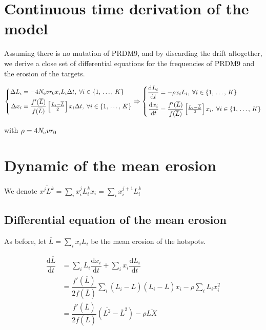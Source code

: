 \documentclass{article}
\begin{document}
\section{Continuous time derivation of the model}
Assuming there is no mutation of PRDM9, and by discarding the drift altogether, we derive a close set of differential equations for the frequencies of PRDM9 and the erosion of the targets.

\begin{equation}
  \left\{
      \begin{aligned}
        \mathrm{\Delta}L_i &= 
        - 4 N_\mathrm{e} v r _0  x_i L_i \mathrm{\Delta}t, \;
             \forall i \in \{ 1, \, \dots, \, K \} \\
        \mathrm{\Delta}x_i &= \dfrac{f'(\overline{L})}{f(\overline{L})} \left[ \tfrac{L_i - \overline{L}}{2} \right]x_i  \mathrm{\Delta}t , \;
         \forall i \in \{ 1, \, \dots, \, K \}\\
      \end{aligned}
    \right.
 \Rightarrow
  \left\{
      \begin{aligned}
        \dfrac{\mathrm{d}L_i}{\mathrm{d}t} &= 
        - \rho  x_i L_i, \;
             \forall i \in \{ 1, \, \dots, \, K \} \\
        \dfrac{\mathrm{d}x_i}{\mathrm{d}t} &= \dfrac{f'(\overline{L})}{f(\overline{L})} \left[ \tfrac{L_i - \overline{L}}{2} \right]x_i , \;
         \forall i \in \{ 1, \, \dots, \, K \}\\
      \end{aligned}
    \right.
\end{equation}

with $\rho = 4 N_\mathrm{e} v r _0$

\section{Dynamic of the mean erosion}
We denote $\overline{x^{j} L^{k}}=\sum_i x_i^{j} L_i^{k} x_i =\sum_i x_i^{j+1} L_i^{k}$

\subsection{Differential equation of the mean erosion}
As before, let $\overline{L}=\sum_i x_i L_i$ be the mean erosion of the hotspots.

\begin{equation}
  \begin{aligned}
    \dfrac{\mathrm{d} \overline{L} }{\mathrm{d}t} &=
    \sum_i L_i \dfrac{\mathrm{d}x_i}{\mathrm{d}t} +  \sum_i x_i \dfrac{\mathrm{d}L_i}{\mathrm{d}t} \\
    &=
    \dfrac{f'(\overline{L})}{2 f(\overline{L})} \sum_i (L_i - \overline{L}) (L_i - \overline{L}) x_i - \rho \sum_i L_i x_i^2\\
    &=
    \dfrac{f'(\overline{L})}{2 f(\overline{L})} (\overline{L^2} - \overline{L}^2) - \rho \overline{L X}\\
  \end{aligned}
\end{equation}
\end{document}
